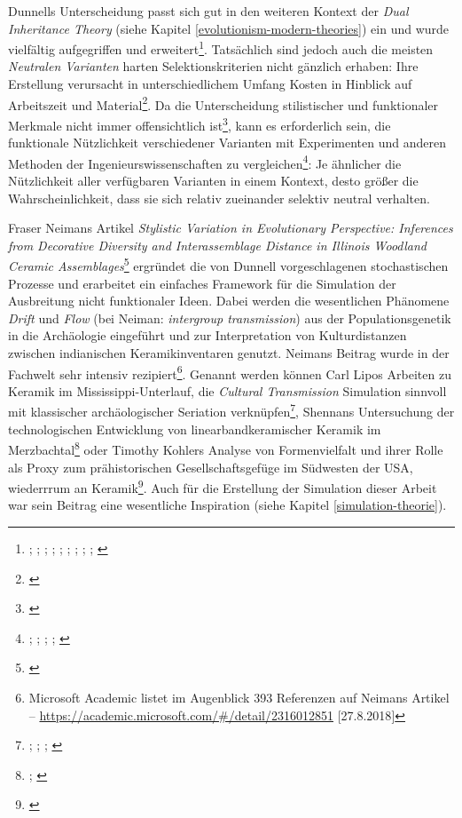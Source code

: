 \documentclass[openany,twoside,twocolumn]{book}
\let\rmarkdownfootnote\footnote%
\def\footnote{\protect\rmarkdownfootnote}
\begin{document}
Dunnells Unterscheidung passt sich gut in den weiteren Kontext der \emph{Dual Inheritance Theory} (siehe Kapitel \ref{evolutionism-modern-theories}) ein und wurde vielfältig aufgegriffen und erweitert\footnote{\textcite{lipo_population_1997}; \textcite{lipo_science_2001}; \textcite{lyman_measuring_2000}; \textcite{neiman_conspicuous_1997-1}; \textcite{neiman_stylistic_1995}; \textcite{rindos_darwinian_1985}; \textcite{rindos_undirected_1989}; \textcite{rogers_natural_2008}; \textcite{shennan_ceramic_2001}; \textcite{teltser_culture_1995}}. Tatsächlich sind jedoch auch die meisten \emph{Neutralen Varianten} harten Selektionskriterien nicht gänzlich erhaben: Ihre Erstellung verursacht in unterschiedlichem Umfang Kosten in Hinblick auf Arbeitszeit und Material\footnote{\textcite{meltzer_study_1981}}. Da die Unterscheidung stilistischer und funktionaler Merkmale nicht immer offensichtlich ist\footnote{\textcite{bettinger_style_1996}}, kann es erforderlich sein, die funktionale Nützlichkeit verschiedener Varianten mit Experimenten und anderen Methoden der Ingenieurswissenschaften zu vergleichen\footnote{\textcite{kornbacher_building_2001}; \textcite{obrien_evolutionary_1994}; \textcite{obrien_variation_1990}; \textcite{pfeffer_engineering_2001-1}; \textcite{wilhelmsen_building_2001}}: Je ähnlicher die Nützlichkeit aller verfügbaren Varianten in einem Kontext, desto größer die Wahrscheinlichkeit, dass sie sich relativ zueinander selektiv neutral verhalten.

Fraser Neimans Artikel \emph{Stylistic Variation in Evolutionary Perspective: Inferences from Decorative Diversity and Interassemblage Distance in Illinois Woodland Ceramic Assemblages}\footnote{\textcite{neiman_stylistic_1995}} ergründet die von Dunnell vorgeschlagenen stochastischen Prozesse und erarbeitet ein einfaches Framework für die Simulation der Ausbreitung nicht funktionaler Ideen. Dabei werden die wesentlichen Phänomene \emph{Drift} und \emph{Flow} (bei Neiman: \emph{intergroup transmission}) aus der Populationsgenetik in die Archäologie eingeführt und zur Interpretation von Kulturdistanzen zwischen indianischen Keramikinventaren genutzt. Neimans Beitrag wurde in der Fachwelt sehr intensiv rezipiert\footnote{Microsoft Academic listet im Augenblick 393 Referenzen auf Neimans Artikel -- \url{https://academic.microsoft.com/\#/detail/2316012851} {[}27.8.2018{]}}. Genannt werden können Carl Lipos Arbeiten zu Keramik im Mississippi-Unterlauf, die \emph{Cultural Transmission} Simulation sinnvoll mit klassischer archäologischer Seriation verknüpfen\footnote{\textcite{lipo_community_2001}; \textcite{lipo_neutralitystyle_2001}; \textcite{lipo_population_1997}; \textcite{lipo_science_2001}}, Shennans Untersuchung der technologischen Entwicklung von linearbandkeramischer Keramik im Merzbachtal\footnote{\textcite{bentley_cultural_2003}; \textcite{shennan_ceramic_2001}} oder Timothy Kohlers Analyse von Formenvielfalt und ihrer Rolle als Proxy zum prähistorischen Gesellschaftsgefüge im Südwesten der USA, wiederrrum an Keramik\footnote{\textcite{kohler_vessels_2004-1}}. Auch für die Erstellung der Simulation dieser Arbeit war sein Beitrag eine wesentliche Inspiration (siehe Kapitel \ref{simulation-theorie}).
\end{document}
